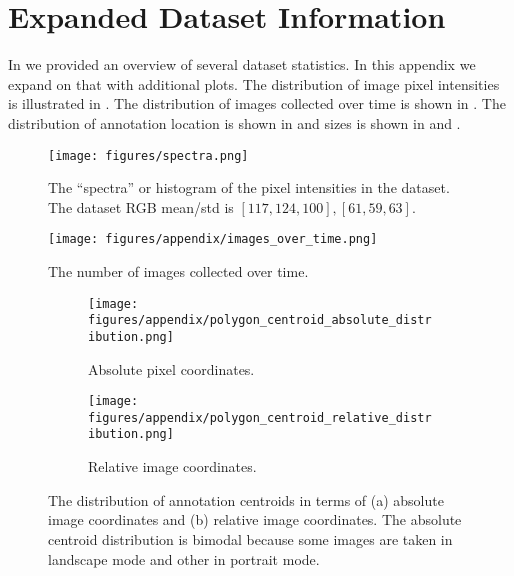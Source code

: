 \appendix

\section{Expanded Dataset Information}

In  we provided an overview of several dataset statistics.
In this appendix we expand on that with additional plots.
The distribution of image pixel intensities is illustrated in .
The distribution of images collected over time is shown in .
The distribution of annotation location is shown in  and sizes is shown
  in  and .


\begin{figure}[ht]
\centering
\texttt{[image: figures/spectra.png]}
\caption[]{
    The ``spectra'' or histogram of the pixel intensities in the dataset. 
    The dataset RGB mean/std is $[117, 124, 100], [61, 59, 63]$.
}
\label{fig:spectra}
\end{figure}


\begin{figure}[ht]
\centering
\texttt{[image: figures/appendix/images\_over\_time.png]}
\caption[]{
    The number of images collected over time.
}
\label{fig:images_over_time}
\end{figure}


\begin{figure}[ht]
\centering
\begin{subfigure}[b]{0.4\textwidth}
 \texttt{[image: figures/appendix/polygon\_centroid\_absolute\_distribution.png]}
 \caption{Absolute pixel coordinates.}
 \label{fig:centroid_abs}
\end{subfigure}
\hfill
\begin{subfigure}[b]{0.4\textwidth}
 \texttt{[image: figures/appendix/polygon\_centroid\_relative\_distribution.png]}
 \caption{Relative image coordinates.}
 \label{fig:centroid_rel}
\end{subfigure}
\caption{The distribution of annotation centroids in terms of (a) absolute image coordinates and (b) relative image coordinates. The absolute centroid distribution is bimodal because some images are taken in landscape mode and other in portrait mode.}
\label{fig:centroid_location_distri}
\end{figure}


